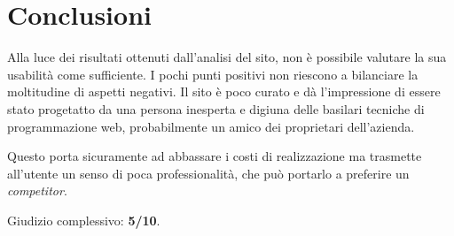 \documentclass[../rapporto-usabilita.tex]{subfiles}
\begin{document}
\section{Conclusioni}
	Alla luce dei risultati ottenuti dall'analisi del sito, non è possibile valutare la sua usabilità come sufficiente. I pochi punti positivi non riescono a bilanciare la moltitudine di aspetti negativi. Il sito è poco curato e dà l'impressione di essere stato progetatto da una persona inesperta e digiuna delle basilari tecniche di programmazione web, probabilmente un amico dei proprietari dell'azienda. 
	
	Questo porta sicuramente ad abbassare i costi di realizzazione ma trasmette all'utente un senso di poca professionalità, che può portarlo a preferire un \textit{competitor}. 
	
	Giudizio complessivo: \textbf{5/10}.
	
\end{document}
